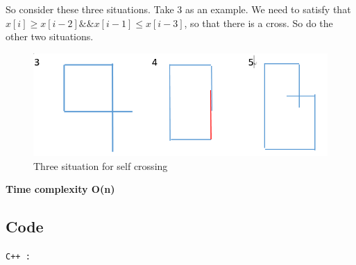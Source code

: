 So consider these three situations. Take 3 as an example.
We need to satisfy that 
$x[i]\geq x[i-2] \&\& x[i-1] \leq x[i-3]$, so that there is a cross.
So do the other two situations.

\begin{figure}[H]
\centering
\includegraphics[scale=0.5]{1.png}
\caption{Three situation for self crossing}
\label{hill}
\end{figure}

\textbf{\color{red}Time complexity O(n)}
\newpage
\subsection{Code}
\texttt{C++ :}


